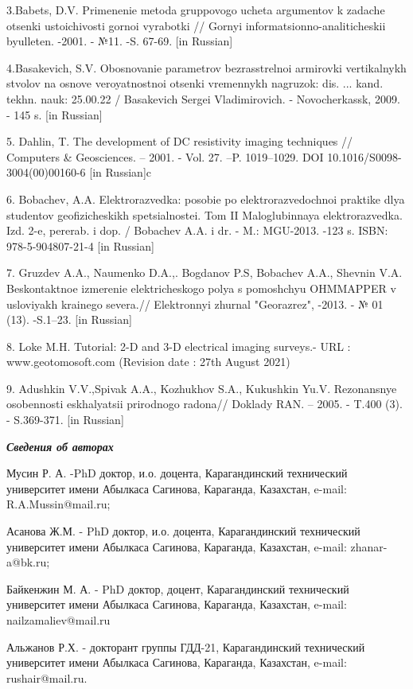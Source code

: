 3.Babets, D.V. Primenenie metoda gruppovogo ucheta argumentov k zadache
otsenki ustoichivosti gornoi vyrabotki // Gornyi
informatsionno-analiticheskii byulleten\textquotesingle. -2001. - №11.
-S. 67-69. {[}in Russian{]}

4.Basakevich, S.V. Obosnovanie parametrov
bezrasstrel\textquotesingle noi armirovki vertikal\textquotesingle nykh
stvolov na osnove veroyatnostnoi otsenki vremennykh nagruzok: dis. ...
kand. tekhn. nauk: 25.00.22 / Basakevich Sergei Vladimirovich. -
Novocherkassk, 2009. - 145 s. {[}in Russian{]}

5. Dahlin, T. The development of DC resistivity imaging techniques //
Computers \& Geosciences. -- 2001. - Vol. 27. --P. 1019--1029. DOI
10.1016/S0098-3004(00)00160-6 {[}in Russian{]}c

6. Bobachev, A.A. Elektrorazvedka: posobie po elektrorazvedochnoi
praktike dlya studentov geofizicheskikh spetsial\textquotesingle nostei.
Tom II Maloglubinnaya elektrorazvedka. Izd. 2-e, pererab. i dop. /
Bobachev A.A. i dr. - M.: MGU-2013. -123 s. ISBN: 978-5-904807-21-4
{[}in Russian{]}

7. Gruzdev A.A., Naumenko D.A.,. Bogdanov P.S, Bobachev A.A., Shevnin
V.A. Beskontaktnoe izmerenie elektricheskogo polya s
pomoshch\textquotesingle yu OHMMAPPER v usloviyakh krainego severa.//
Elektronnyi zhurnal "Georazrez", -2013. - № 01 (13). -S.1--23. {[}in
Russian{]}

8. Loke M.H. Tutorial: 2-D and 3-D electrical imaging surveys.- URL :
www.geotomosoft.com (Revision date : 27th August 2021)

9. Adushkin V.V.,Spivak A.A., Kozhukhov S.A., Kukushkin Yu.V.
Rezonansnye osobennosti eskhalyatsii prirodnogo radona// Doklady RAN. --
2005. - T.400 (3). - S.369-371. {[}in Russian{]}

\emph{{\bfseries Сведения об авторах}}

Мусин Р. А. -PhD доктор, и.о. доцента, Карагандинский технический
университет имени Абылкаса Сагинова, Караганда, Казахстан, e-mail:
R.A.Mussin@mail.ru;

Асанова Ж.М. - PhD доктор, и.о. доцента, Карагандинский технический
университет имени Абылкаса Сагинова, Караганда, Казахстан, e-mail:
zhanar-a@bk.ru;

Байкенжин М. А. - PhD доктор, доцент, Карагандинский технический
университет имени Абылкаса Сагинова, Караганда, Казахстан, e-mail:
nailzamaliev@mail.ru

Альжанов Р.Х. - докторант группы ГДД-21, Карагандинский технический
университет имени Абылкаса Сагинова, Караганда, Казахстан, e-mail:
rushair@mail.ru.

